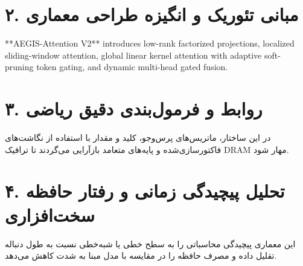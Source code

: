 \documentclass[12pt,a4paper]{article}
\begin{document}
\section*{۲. مبانی تئوریک و انگیزه طراحی معماری}
**AEGIS-Attention V2** introduces low-rank factorized projections, localized sliding-window attention, global linear kernel attention with adaptive soft-pruning token gating, and dynamic multi-head gated fusion.

\section*{۳. روابط و فرمول‌بندی دقیق ریاضی}
در این ساختار، ماتریس‌های پرس‌وجو، کلید و مقدار با استفاده از نگاشت‌های فاکتورسازی‌شده و پایه‌های متعامد بازآرایی می‌گردند تا ترافیک DRAM مهار شود.

\section*{۴. تحلیل پیچیدگی زمانی و رفتار حافظه سخت‌افزاری}
این معماری پیچیدگی محاسباتی را به سطح خطی یا شبه‌خطی نسبت به طول دنباله تقلیل داده و مصرف حافظه را در مقایسه با مدل مبنا به شدت کاهش می‌دهد.
\end{document}
